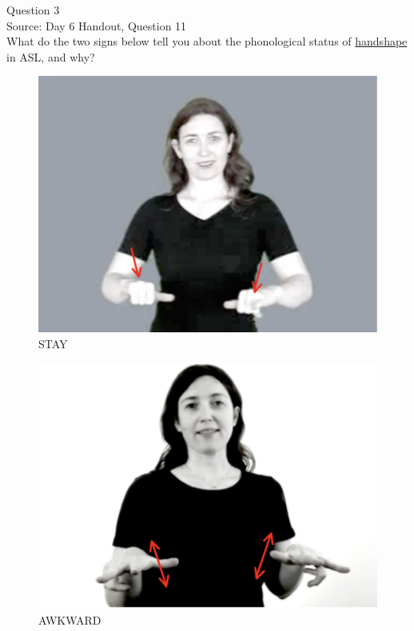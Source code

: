\documentclass[12pt]{article}
\begin{document}
\newpage

{\large Question 3}\\

Source: Day 6 Handout, Question 11\\

What do the two signs below tell you about the phonological status of \underline{handshape} in ASL, and why?\\

\begin{figure}[H]
\includegraphics{../images/asl_stay.png}
\caption{STAY}
\end{figure}
\begin{figure}[H]
\includegraphics{../images/asl_awkward.png}
\caption{AWKWARD}
\end{figure}
\end{document}
